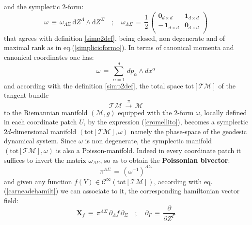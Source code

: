 \documentclass[10pt,a4paper]{article}
\newcommand{\ft}[2]{{\textstyle\frac{#1}{#2}}}
\begin{document}
and the symplectic $2$-form:
\begin{equation}\label{symp2form}
  \omega \, \equiv\, \omega_{\Lambda\Sigma} \, \mathrm{d}Z^\Lambda \wedge \mathrm{d}Z^\Sigma  \quad ; \quad
  \omega_{\Lambda\Sigma} \, = \, \ft 12 \, \left(
                                   \begin{array}{c|c}
                                     \mathbf{0}_{d\times d} & \mathbf{1}_{d\times d} \\
                                     \hline
                                    \mathbf{ -}\,\mathbf{1}_{d\times d} & \mathbf{0}_{d\times d} \\
                                   \end{array}
                                 \right)
\end{equation}
that agrees with definition \ref{simp2def}, being closed, non degenerate and of maximal rank as in eq.(\ref{simplicioformo}).
In terms of canonical momenta and canonical coordinates one has:
\begin{equation}\label{cromellito}
  \omega \, = \, \sum_{\alpha = 1}^d \, dp_\alpha \wedge dx^\alpha
\end{equation}
and according with the definition \ref{simp2def}, the total space $\mathrm{tot}\left[\mathcal{TM}\right]$ of the tangent bundle
\begin{equation}\label{ghino}
  \mathcal{TM}\, \stackrel{\pi}{\longrightarrow} \,\mathcal{M}
\end{equation}
to the Riemannian manifold $(\mathcal{M},g)$
equipped with the $2$-form $\omega$, locally defined in each coordinate patch $U$, by the expression (\ref{cromellito}), becomes a symplectic $2d$-dimensional manifold $\left(\mathrm{tot}\left[\mathcal{TM}\right],\omega\right)$ namely the phase-space of the geodesic dynamical system.
Since $\omega$ is non degenerate, the symplectic manifold $\left(\mathrm{tot}\left[\mathcal{TM}\right],\omega\right)$ is also a Poisson-manifold. Indeed in every coordinate patch it suffices to invert the matrix $\omega_{\Lambda\Sigma}$, so as to obtain the \textbf{Poissonian bivector}:
\begin{equation}\label{crisalide}
  \pi^{\Lambda\Sigma} \, = \, \left(\omega^{-1}\right)^{\Lambda\Sigma}
\end{equation}
and given any function $f(Y) \in \mathcal{C}^\infty\left(\mathrm{tot}\left[\mathcal{TM}\right] \right)$, according with eq.(\ref{carneadehamilt}) we can associate to it, the corresponding hamiltonian vector field:
\begin{equation}\label{carolinagalbani}
  \boldsymbol{X}_f \, \equiv \, \pi^{\Lambda\Sigma}\, \partial_\Lambda f \, \partial_\Sigma \quad ; \quad \partial_\Gamma \, \equiv \, \frac{\partial}{\partial Z^\Gamma}
\end{equation}
\end{document}
